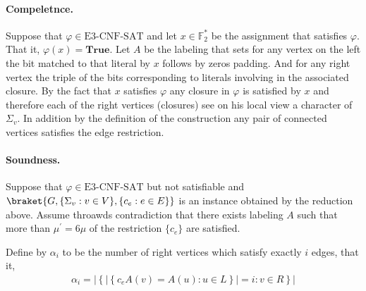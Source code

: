 \documentclass{article}
\begin{document}
%

\paragraph{Compeletnce. } Suppose that $\varphi \in \text{E3-CNF-SAT}$ and let $x \in \mathbb{F}_{2}^{*}$ be the assignment that satisfies $\varphi$. That it, $\varphi\left( x \right) = \mathbf{True}$. Let $A$ be the labeling that sets for any vertex on the left the bit matched to that literal by $x$ follows by zeros padding. And for any right vertex the triple of the bits corresponding to literals involving in the associated closure. By the fact that $x$ satisfies $\varphi$ any closure in $\varphi$ is satisfied by $x$ and therefore each of the right vertices (closures) see on his local view a character of $\Sigma_{v}$. In addition by the definition of the construction any pair of connected vertices satisfies the edge restriction. 

\paragraph{Soundness.} Suppose that $\varphi \in \text{E3-CNF-SAT}$ but not satisfiable and $\braket{G, \{ \Sigma_{v} : v \in V \}, \{c_{e} : e \in E \}} $ is an instance obtained by the reduction above. Assume throawds contradiction that there exists labeling $A$ such that more than $\mu^{\prime}= 6\mu$ of the restriction $\{c_{e}\}$ are satisfied. 

Define by $\alpha_{i}$ to be the number of right vertices which satisfy exactly $i$ edges, that it, 
\begin{equation*}
  \begin{split}
    \alpha_{i} = \left| \left\{ | \left\{ c_{e}A\left( v \right) = A\left( u \right) : u \in L \right\} | = i : v \in R   \right\} \right| 
  \end{split}
\end{equation*}
\end{document}
